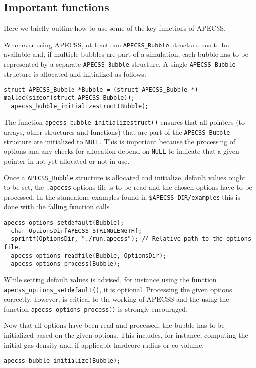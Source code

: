\subsection{Important functions}

Here we briefly outline how to use some of the key functions of APECSS. 

Whenever using APECSS, at least one {\tt APECSS\_Bubble} structure has to be available and, if multiple bubbles are part of a simulation, each bubble has to be represented by a separate {\tt APECSS\_Bubble} structure. A single {\tt APECSS\_Bubble} structure is allocated and initialized as follows:
\begin{lstlisting}[style=CStyle]
  struct APECSS_Bubble *Bubble = (struct APECSS_Bubble *) malloc(sizeof(struct APECSS_Bubble));
  apecss_bubble_initializestruct(Bubble);
\end{lstlisting}\vspace{-0.75em}
The function {\tt apecss\_bubble\_initializestruct()} ensures that all pointers (to arrays, other structures and functions) that are part of the {\tt APECSS\_Bubble} structure are initialized to {\tt NULL}. This is important because the processing of options and any checks for allocation depend on {\tt NULL} to indicate that a given pointer in not yet allocated or not in use.

Once a {\tt APECSS\_Bubble} structure is allocated and initialize, default values ought to be set, the {\tt *.apecss} options file is to be read and the chosen options have to be processed. In the standalone examples found in {\tt \$APECSS\_DIR/examples} this is done with the falling function calls:
\begin{lstlisting}[style=CStyle]
  apecss_options_setdefault(Bubble);
  char OptionsDir[APECSS_STRINGLENGTH];
  sprintf(OptionsDir, "./run.apecss"); // Relative path to the options file.
  apecss_options_readfile(Bubble, OptionsDir);
  apecss_options_process(Bubble);
\end{lstlisting}\vspace{-0.75em}
While setting default values is advised, for instance using the function {\tt apecss\_options\_setdefault()}, it is optional. Processing the given options correctly, however, is critical to the working of APECSS and the using the function {\tt apecss\_options\_process()} is strongly encouraged.

Now that all options have been read and processed, the bubble has to be initialized based on the given options. This includes, for instance, computing the initial gas density and, if applicable hardcore radius or co-volume.
\begin{lstlisting}[style=CStyle]
  apecss_bubble_initialize(Bubble);
\end{lstlisting}%

